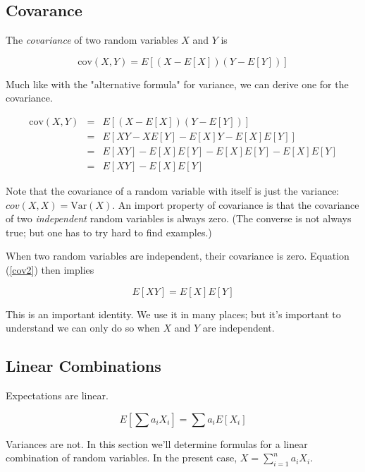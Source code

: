 \documentclass[]{article}
\begin{document}
\subsection{Covarance}

The \emph{covariance} of two random variables $X$ and $Y$ is

\begin{equation} \label{def_covariance}
\mbox{cov}(X,Y) = E\left[(X - E[X])(Y - E[Y])\right]
\end{equation}

Much like with the "alternative formula" for variance, we
can derive one for the covariance.

\begin{eqnarray}
\mbox{cov}(X,Y) &= &E\left[(X - E[X])(Y - E[Y])\right] \nonumber \\
  &= &E\left[ XY - X E[Y] - E[X] Y - E[X] E[Y] \right] \nonumber \\
  &= &E[XY] - E[X] E[Y] - E[X] E[Y] - E[X] E[Y] \nonumber \\
  &= &E[XY] - E[X] E[Y] \label{cov2}
\end{eqnarray}

Note that the covariance of a random variable with
itself is just the variance: $cov(X,X) = \mbox{Var}(X)$.
An import property of covariance is that the covariance
of two \emph{independent} random variables is always zero.
(The converse is not always true; but one has to try hard
to find examples.)

When two random variables are independent, their covariance
is zero.  Equation (\ref{cov2}) then implies

\begin{equation} \label{cov_zero}
E[XY] = E[X]E[Y]
\end{equation}

This is an important identity.  We use it in many places; but
it's important to understand we can only do so when $X$ and
$Y$ are independent.

\subsection{Linear Combinations}

Expectations are linear.

$$
E\left[ \sum a_i X_i \right] = \sum a_i E[X_i]
$$

Variances are not.  In this section we'll determine
formulas for
a linear combination of random variables.
In the present case, $X = \sum_{i=1}^n a_i X_i$.
\end{document}
